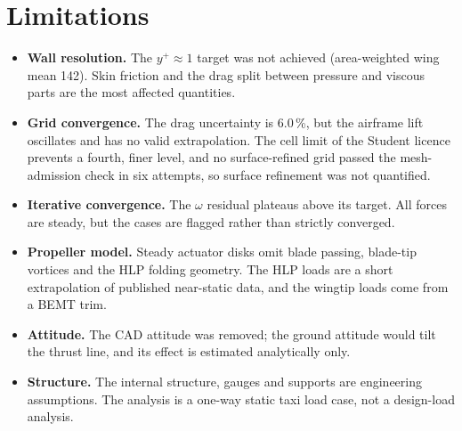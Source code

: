 \documentclass[10pt,a4paper]{article}
\begin{document}
\section{Limitations}
\label{sec:limits}
\begin{itemize}[leftmargin=1.3em,itemsep=1pt,topsep=2pt]
  \item \textbf{Wall resolution.} The $y^+\approx1$ target was not achieved (area-weighted wing mean 142). Skin friction and
        the drag split between pressure and viscous parts are the most affected quantities.
  \item \textbf{Grid convergence.} The drag uncertainty is 6.0\,\%, but the airframe lift oscillates and has no valid
        extrapolation. The cell limit of the Student licence prevents a fourth, finer level, and no surface-refined
        grid passed the mesh-admission check in six attempts, so surface refinement was not quantified.
  \item \textbf{Iterative convergence.} The $\omega$ residual plateaus above its target. All forces are steady,
        but the cases are flagged rather than strictly converged.
  \item \textbf{Propeller model.} Steady actuator disks omit blade passing, blade-tip vortices and the HLP folding geometry.
        The HLP loads are a short extrapolation of published near-static data, and the wingtip loads come from a
        BEMT trim.
  \item \textbf{Attitude.} The CAD attitude was removed; the ground attitude would tilt the thrust line, and its
        effect is estimated analytically only.
  \item \textbf{Structure.} The internal structure, gauges and supports are engineering assumptions. The analysis is
        a one-way static taxi load case, not a design-load analysis.
\end{itemize}

\end{document}
